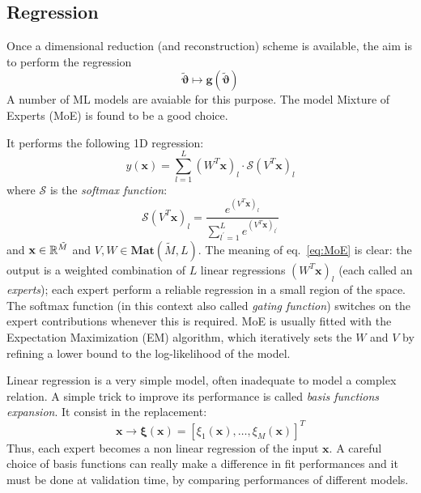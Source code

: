 \subsection{Regression}
Once a dimensional reduction (and reconstruction) scheme is available, the aim is to perform the regression
\begin{equation} \label{eq:regression_model}
	{\tilde{\boldsymbol{\vartheta}}} \longmapsto \boldsymbol{g}({\tilde{\boldsymbol{\vartheta}}})
\end{equation}
A number of ML models are avaiable for this purpose. The model Mixture of Experts (MoE) \cite{Jacobs1991AdaptiveMoE} \cite[ch. 11]{murphy2012machine} is found to be a good choice.
\par
It performs the following 1D regression:
\begin{equation} \label{eq:MoE}
	y(\mathbf{x}) = \sum_{l=1}^L (W^T \mathbf{x})_l \cdot \mathcal{S}(V^T\mathbf{x})_l
\end{equation}
where $\mathcal{S}$ is the \textit{softmax function}:
\begin{equation} \label{eq:softmax}
	\mathcal{S}(V^T{\mathbf{x}})_l = \frac{e^{(V^T{\mathbf{x}})_l}}{\sum_{l^\prime = 1}^L e^{(V^T{\mathbf{x}})_{l^\prime}}}
\end{equation}
and ${\mathbf{x}} \in \mathbb{R}^{\tilde{M}}$ and $V,W \in \mathbf{Mat}(\tilde{M},L)$.
The meaning of eq.~\eqref{eq:MoE} is clear: the output is a weighted combination of $L$ linear regressions $(W^T \mathbf{x})_l$ (each called an \textit{experts}); each expert perform a reliable regression in a small region of the space. The softmax function (in this context also called \textit{gating function}) switches on the expert contributions whenever this is required.
MoE is usually fitted with the Expectation Maximization (EM) algorithm, which iteratively sets the $W$ and $V$ by refining a lower bound to the log-likelihood of the model.
\par
Linear regression is a very simple model, often inadequate to model a complex relation. A simple trick to improve its performance is called \textit{basis functions expansion}. It consist in the replacement:
\begin{equation}
	{\mathbf{x}} \longrightarrow {\boldsymbol{\xi}}({\mathbf{x}}) = [\xi_1({\mathbf{x}}), \ldots, \xi_M({\mathbf{x}})]^T
\end{equation}
Thus, each expert becomes a non linear regression of the input ${\mathbf{x}}$.
A careful choice of basis functions can really make a difference in fit performances and it must be done at validation time, by comparing performances of different models.
